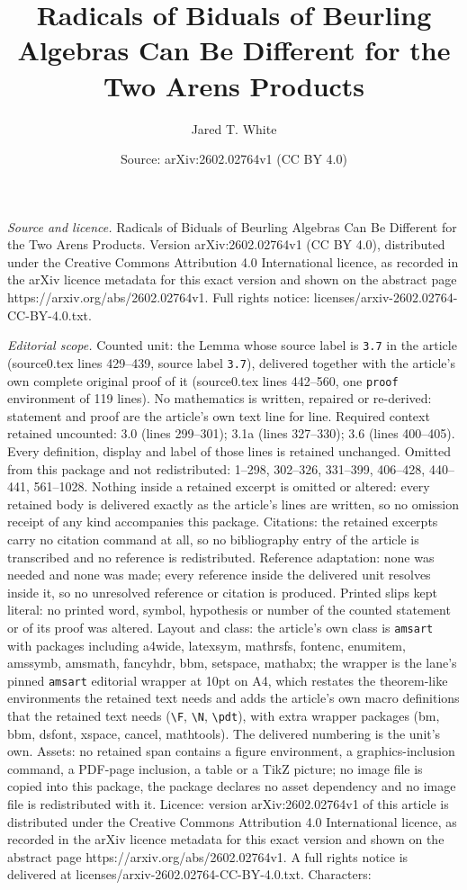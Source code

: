 \documentclass[10pt,a4paper]{amsart}
\title[Radicals of Biduals of Beurling Algebras Can Be Different fo]{Radicals of Biduals of Beurling Algebras Can Be Different for the Two Arens Products}
\author{Jared T. White}
\date{Source: arXiv:2602.02764v1 (CC BY 4.0)}
\begin{document}
\maketitle

\noindent\emph{Source and licence.} Radicals of Biduals of Beurling Algebras Can Be Different for the Two Arens Products. Version arXiv:2602.02764v1 (CC BY 4.0), distributed under the Creative Commons Attribution 4.0 International licence, as recorded in the arXiv licence metadata for this exact version and shown on the abstract page https://arxiv.org/abs/2602.02764v1. Full rights notice: licenses/arxiv-2602.02764-CC-BY-4.0.txt.\par\smallskip

\noindent\textit{Editorial scope.} Counted unit: the Lemma whose source label is \texttt{3.7} in the article (source0.tex lines 429--439, source label \texttt{3.7}), delivered together with the article's own complete original proof of it (source0.tex lines 442--560, one \texttt{proof} environment of 119 lines). No mathematics is written, repaired or re-derived: statement and proof are the article's own text line for line. Required context retained uncounted: 3.0 (lines 299--301); 3.1a (lines 327--330); 3.6 (lines 400--405). Every definition, display and label of those lines is retained unchanged. Omitted from this package and not redistributed: 1--298, 302--326, 331--399, 406--428, 440--441, 561--1028. Nothing inside a retained excerpt is omitted or altered: every retained body is delivered exactly as the article's lines are written, so no omission receipt of any kind accompanies this package. Citations: the retained excerpts carry no citation command at all, so no bibliography entry of the article is transcribed and no reference is redistributed. Reference adaptation: none was needed and none was made; every reference inside the delivered unit resolves inside it, so no unresolved reference or citation is produced. Printed slips kept literal: no printed word, symbol, hypothesis or number of the counted statement or of its proof was altered. Layout and class: the article's own class is \texttt{amsart} with packages including a4wide, latexsym, mathrsfs, fontenc, enumitem, amssymb, amsmath, fancyhdr, bbm, setspace, mathabx; the wrapper is the lane's pinned \texttt{amsart} editorial wrapper at 10pt on A4, which restates the theorem-like environments the retained text needs and adds the article's own macro definitions that the retained text needs (\texttt{\textbackslash F}, \texttt{\textbackslash N}, \texttt{\textbackslash pdt}), with extra wrapper packages (bm, bbm, dsfont, xspace, cancel, mathtools). The delivered numbering is the unit's own. Assets: no retained span contains a figure environment, a graphics-inclusion command, a PDF-page inclusion, a table or a TikZ picture; no image file is copied into this package, the package declares no asset dependency and no image file is redistributed with it. Licence: version arXiv:2602.02764v1 of this article is distributed under the Creative Commons Attribution 4.0 International licence, as recorded in the arXiv licence metadata for this exact version and shown on the abstract page https://arxiv.org/abs/2602.02764v1. A full rights notice is delivered at licenses/arxiv-2602.02764-CC-BY-4.0.txt. Characters: 
\end{document}
